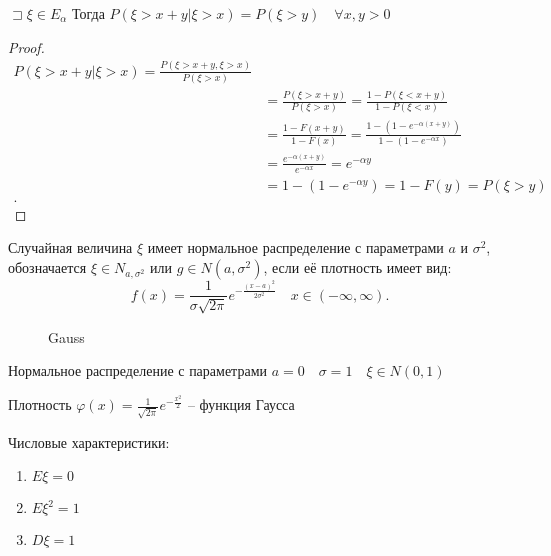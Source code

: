 \begin{theorem}

    $\sqsupset \xi\in E_\alpha$ Тогда $P\left( \xi > x + y| \xi > x \right) = P\left( \xi > y \right) \quad \forall x,y >0 $
\end{theorem}
\begin{proof}
     \begin{align*}
         P\left( \xi > x+y | \xi > x \right)  = \frac{P\left( \xi > x + y, \xi > x \right) }{P\left( \xi > x \right) }\\
         &= \frac{P\left( \xi > x+y \right) }{P\left( \xi > x \right) } = \frac{1 - P\left( \xi < x +y \right) }{1 - P\left( \xi < x \right) } \\
         &= \frac{1 - F(x+y)}{1  - F(x)}  = \frac{1 - \left( 1 - e^{-\alpha(x+y)} \right) }{1 - \left( 1 - e^{-\alpha x} \right) }\\
         &= \frac{e^{-\alpha(x+y)}}{e^{-\alpha x}} = e^{-\alpha y} \\
         &= 1 - \left( 1 - e^{-\alpha y} \right)  = 1 - F(y) = P\left( \xi > y \right)  \\
    .\end{align*}
\end{proof}

\begin{definition}
    Случайная величина $\xi$ имеет нормальное распределение с параметрами  $a$ и  $\sigma^2$, обозначается  $\xi\in N_{a, \sigma^2}$ или $g\in N(a, \sigma^2)$, если её плотность имеет вид:
     \[
         f(x) = \frac{1}{\sigma \sqrt{2\pi } }e^{- \frac{\left( x-a \right) ^2}{2\sigma^2}}\quad x\in \left( -\infty , \infty  \right) 
    .\] 

\begin{figure}[!ht]
    \centering
    \caption{Gauss}
    \label{fig:gauss}
\end{figure}
\end{definition}

\begin{definition}

    Нормальное распределение с параметрами $a = 0\quad \sigma =  1\quad \xi\in N(0,1)$

    Плотность  $\varphi(x) = \frac{1}{\sqrt{2\pi } }e^{-\frac{x^2}{2}}$ -- функция Гаусса
\end{definition}

Числовые характеристики:
\begin{enumerate}
    \item $E\xi = 0$
    \item $E\xi^2 = 1$
    \item $D\xi = 1$
\end{enumerate}

